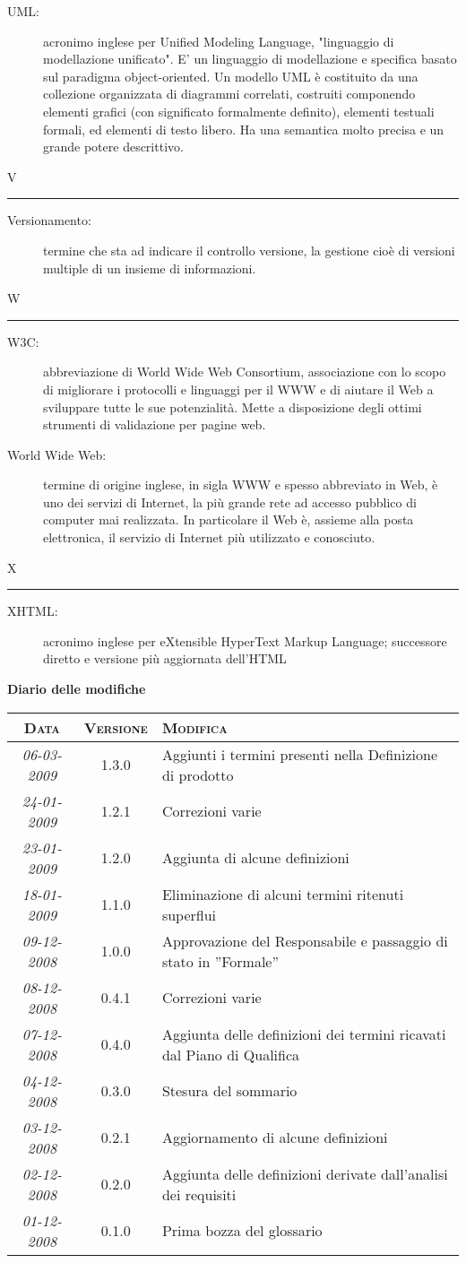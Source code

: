 \documentclass[11pt,a4paper]{article}
\newcommand{\modifiche} 
{
\newpage
\begin{center}
\textbf{Diario delle modifiche} \\
\bigskip
\begin{tabular}{|c|c|p{0.62\textwidth}|}
\hline
\textsc{Data} & \textsc{Versione} & \textsc{Modifica} \\
\hline
\hline
\textit{06-03-2009} & 1.3.0 & Aggiunti i termini presenti nella Definizione di prodotto\\
\hline
\textit{24-01-2009} & 1.2.1 & Correzioni varie\\
\hline
\textit{23-01-2009} & 1.2.0 & Aggiunta di alcune definizioni\\
\hline
\textit{18-01-2009} & 1.1.0 & Eliminazione di alcuni termini ritenuti superflui\\
\hline
\textit{09-12-2008} & 1.0.0 & Approvazione del Responsabile e passaggio di stato in ''Formale''\\
\hline
\textit{08-12-2008} & 0.4.1 & Correzioni varie \\
\hline
\textit{07-12-2008} & 0.4.0 & Aggiunta delle definizioni dei termini ricavati dal Piano di Qualifica \\
\hline
\textit{04-12-2008} & 0.3.0 & Stesura del sommario \\
\hline
\textit{03-12-2008} & 0.2.1 & Aggiornamento di alcune definizioni \\
\hline
\textit{02-12-2008} & 0.2.0 & Aggiunta delle definizioni derivate dall'analisi dei requisiti \\
\hline
\textit{01-12-2008} & 0.1.0 & Prima bozza del glossario \\
\hline
\end{tabular}
\end{center}
}
\begin{document}
\normalsize
\begin{description}
	\item[UML:] acronimo inglese per Unified Modeling Language, "linguaggio di modellazione unificato". E' un linguaggio di modellazione e specifica basato sul paradigma object-oriented. Un modello UML è costituito da una collezione organizzata di diagrammi correlati, costruiti componendo elementi grafici (con significato formalmente definito), elementi testuali formali, ed elementi di testo libero. Ha una semantica molto precisa e un grande potere descrittivo.
\end{description}
\bigskip
\Huge V \bigskip
\hrule
\smallskip
\normalsize
\begin{description}
	\item[Versionamento:] termine che sta ad indicare il controllo versione, la gestione cioè di versioni multiple di un insieme di informazioni.
\end{description}
\bigskip
\Huge W \bigskip
\hrule
\smallskip
\normalsize
\begin{description}
	\item[W3C:] abbreviazione di World Wide Web Consortium, associazione con lo scopo di migliorare i protocolli e linguaggi per il WWW e di aiutare il Web a sviluppare tutte le sue potenzialità. Mette a disposizione degli ottimi strumenti di validazione per pagine web.
	\item[World Wide Web:] termine di origine inglese, in sigla WWW e spesso abbreviato in Web, è uno dei servizi di Internet, la più grande rete ad accesso pubblico di computer mai realizzata. In particolare il Web è, assieme alla posta elettronica, il servizio di Internet più utilizzato e conosciuto.
\end{description}
\bigskip
\Huge X \bigskip
\hrule
\smallskip
\normalsize
\begin{description}
	\item[XHTML:] acronimo inglese per eXtensible HyperText Markup Language; successore diretto e versione più aggiornata dell'HTML
\end{description}
\modifiche
\end{document}
